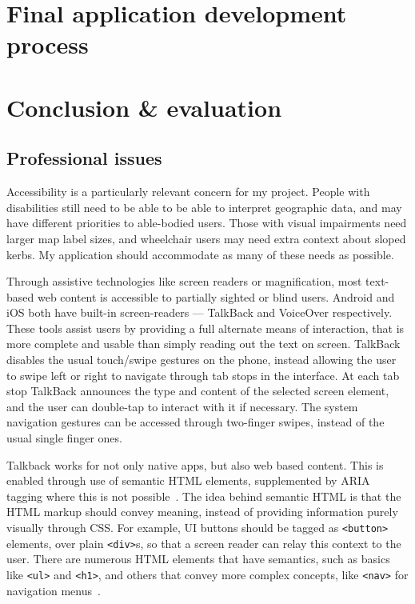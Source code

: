 \documentclass{final_report}
\begin{document}
\clearpage
\chapter{Final application development process}


\clearpage
\chapter{Conclusion \& evaluation}

\section{Professional issues}

Accessibility is a particularly relevant concern for my project. People with disabilities still need to be able to be able to interpret geographic data, and may have different priorities to able-bodied users. Those with visual impairments need larger map label sizes, and wheelchair users may need extra context about sloped kerbs. My application should accommodate as many of these needs as possible.

Through assistive technologies like screen readers or magnification, most text-based web content is accessible to partially sighted or blind users. Android and iOS both have built-in screen-readers --- TalkBack and VoiceOver respectively. These tools assist users by providing a full alternate means of interaction, that is more complete and usable than simply reading out the text on screen. TalkBack disables the usual touch/swipe gestures on the phone, instead allowing the user to swipe left or right to navigate through tab stops in the interface. At each tab stop TalkBack announces the type and content of the selected screen element, and the user can double-tap to interact with it if necessary. The system navigation gestures can be accessed through two-finger swipes, instead of the usual single finger ones.

Talkback works for not only native apps, but also web based content. This is enabled through use of semantic HTML elements, supplemented by ARIA tagging where this is not possible~\cite{w3c-aria}. The idea behind semantic HTML is that the HTML markup should convey meaning, instead of providing information purely visually through CSS\@. For example, UI buttons should be tagged as \texttt{<button>} elements, over plain \texttt{<div>}s, so that a screen reader can relay this context to the user. There are numerous HTML elements that have semantics, such as basics like \texttt{<ul>} and \texttt{<h1>}, and others that convey more complex concepts, like \texttt{<nav>} for navigation menus~\cite{mdn-accessibility-basis}.
\end{document}
